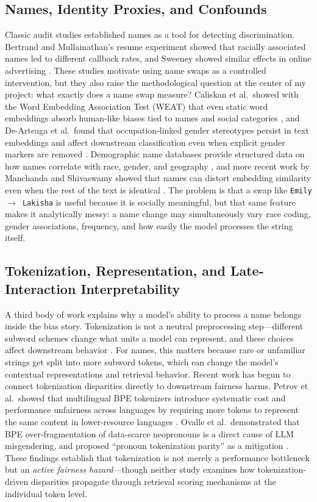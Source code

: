 \documentclass[acmsmall,screen,review]{acmart}
\begin{document}
\subsection{Names, Identity Proxies, and Confounds}

Classic audit studies established names as a tool for detecting discrimination. Bertrand and Mullainathan's resume experiment showed that racially associated names led to different callback rates, and Sweeney showed similar effects in online advertising \cite{bertrand2004,sweeney2013}. These studies motivate using name swaps as a controlled intervention, but they also raise the methodological question at the center of my project: what exactly does a name swap measure? Caliskan et al.\ showed with the Word Embedding Association Test (WEAT) that even static word embeddings absorb human-like biases tied to names and social categories \cite{caliskan2017}, and De-Arteaga et al.\ found that occupation-linked gender stereotypes persist in text embeddings and affect downstream classification even when explicit gender markers are removed \cite{dearteaga2019}. Demographic name databases provide structured data on how names correlate with race, gender, and geography \cite{rosenman2023}, and more recent work by Manchanda and Shivaswamy showed that names can distort embedding similarity even when the rest of the text is identical \cite{manchanda2025}. The problem is that a swap like \texttt{Emily $\rightarrow$ Lakisha} is useful because it is socially meaningful, but that same feature makes it analytically messy: a name change may simultaneously vary race coding, gender associations, frequency, and how easily the model processes the string itself.

\subsection{Tokenization, Representation, and Late-Interaction Interpretability}

A third body of work explains why a model's ability to process a name belongs inside the bias story. Tokenization is not a neutral preprocessing step---different subword schemes change what units a model can represent, and these choices affect downstream behavior \cite{bostrom2020}. For names, this matters because rare or unfamiliar strings get split into more subword tokens, which can change the model's contextual representations and retrieval behavior. Recent work has begun to connect tokenization disparities directly to downstream fairness harms. Petrov et al.\ showed that multilingual BPE tokenizers introduce systematic cost and performance unfairness across languages by requiring more tokens to represent the same content in lower-resource languages \cite{petrov2023}. Ovalle et al.\ demonstrated that BPE over-fragmentation of data-scarce neopronouns is a direct cause of LLM misgendering, and proposed ``pronoun tokenization parity'' as a mitigation \cite{ovalle2024}. These findings establish that tokenization is not merely a performance bottleneck but an \emph{active fairness hazard}---though neither study examines how tokenization-driven disparities propagate through retrieval scoring mechanisms at the individual token level.
\end{document}
